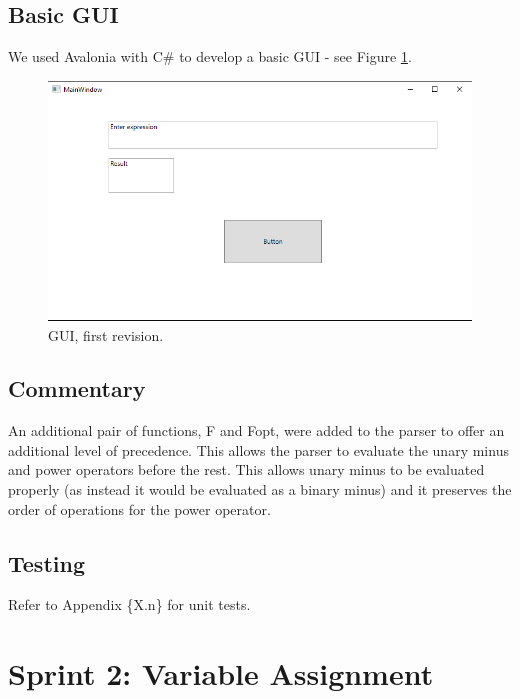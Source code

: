 \documentclass[a4paper, oneside, 11pt]{report}
\begin{document}
	\subsection{Basic GUI}
	We used Avalonia with C\# to develop a basic GUI - see Figure \ref{gui01}.
	\begin{figure}[htb]
		\begin{center}

			\includegraphics[width=0.9 \columnwidth]{GUI_01}

			\caption{GUI, first revision.}
			\label{gui01}
		\end{center}
	\end{figure}

	\subsection{Commentary}
	An additional pair of functions, F and Fopt, were added to the parser to offer an additional level of precedence. This allows the parser to evaluate the unary minus and power operators before the rest. This allows unary minus to be evaluated properly (as instead it would be evaluated as a binary minus) and it preserves the order of operations for the power operator.

	\subsection{Testing}
	Refer to Appendix \{X.n\} for unit tests.

	\clearpage
	\section{Sprint 2: Variable Assignment}
\end{document}
